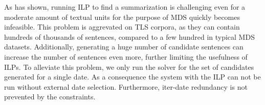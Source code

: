 \documentclass[a4paper,BCOR=10mm]{report}
\begin{document}
%
%
%
%
%
%
%
%
%
%


As \citet{mcdonald} has shown, running ILP to find a summarization is challenging even for a moderate amount of textual units for the purpose of MDS quickly becomes infeasible.
This problem is aggrevated on TLS corpora, as they can contain hundreds of thousands of sentences, compared to a few hundred in typical MDS datasets. Additionally, generating a huge number of candidate sentences can increase the number of sentences even more, further limiting the usefulness of ILPs.
To alleviate this problem, we only run the solver for the set of candidates generated for a single date. As a consequence the system with the ILP can not be run without external date selection. Furthermore, iter-date redundancy is not prevented by the constraints.
\end{document}
